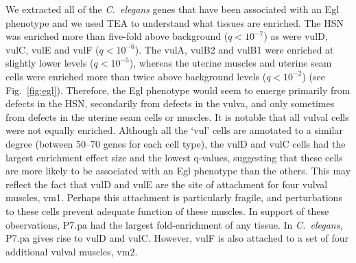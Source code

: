\documentclass[10pt, onecolumn]{article}
\newcommand{\cel}{\emph{C.~elegans}}
\newcommand{\qval}[1]{\ensuremath{q<10^{-#1}}}
\begin{document}
We extracted all of the \cel{} genes that have been associated with an Egl
phenotype and we used TEA to understand what tissues are enriched. The HSN was
enriched more than five-fold above background (\qval{7}) as were vulD, vulC,
vulE and vulF (\qval{6}). The vulA, vulB2 and vulB1 were enriched at slightly
lower levels (\qval{5}), whereas the uterine muscles and uterine seam cells were
enriched more than twice above background levels (\qval{2}) (see
Fig.~\ref{fig:egl}). Therefore, the Egl phenotype would seem to emerge primarily
from defects in the HSN, secondarily from defects in the vulva, and only
sometimes from defects in the uterine seam cells or muscles. It is notable that
all vulval cells were not equally enriched. Although all the `vul' cells are
annotated to a similar degree (between 50--70 genes for each cell type), the
vulD and vulC cells had the largest enrichment effect size and the lowest
q-values, suggesting that these cells are more likely to be associated with an
Egl phenotype than the others. This may reflect the fact that vulD and vulE are
the site of attachment for four vulval muscles, vm1. Perhaps this attachment is
particularly fragile, and perturbations to these cells prevent adequate function
of these muscles. In support of these observations, P7.pa had the largest
fold-enrichment of any tissue. In \cel{}, P7.pa gives rise to vulD and vulC.
However, vulF is also attached to a set of four additional vulval muscles, vm2.
\end{document}
